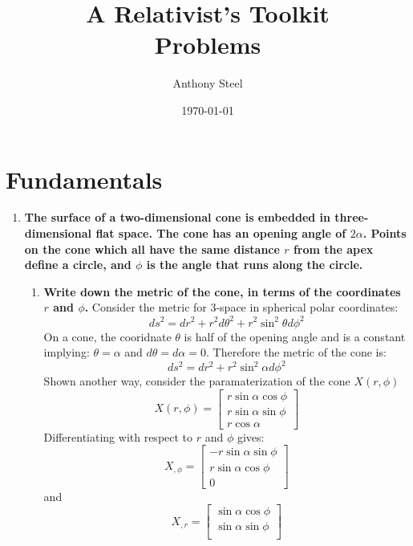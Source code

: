 \documentclass[9pt]{report}
\begin{document}
\title{A Relativist's Toolkit\protect\\ Problems}
\author{Anthony Steel}
\date{\today}
\maketitle
\chapter{Fundamentals}
\begin{enumerate}
  \item \textbf{The surface of a two-dimensional cone is embedded in
      three-dimensional flat space. The cone has an opening angle of
      $2\alpha$. Points on the cone which all have the same distance
      $r$ from the apex define a circle, and $\phi$ is the angle that
      runs along the circle.
    }
    \begin{enumerate}
      \item \textbf{Write down the metric of the cone, in terms of the
        coordinates $r$ and $\phi$.}
        Consider the metric for 3-space in spherical polar coordinates:
        \[
          ds^2 = dr^2 + r^2d\theta^2 + r^2\sin^2\theta d\phi^2
        \]
        On a cone, the cooridnate $\theta$ is half of the opening angle and is a
        constant implying: $\theta=\alpha$ and $d\theta=d\alpha=0$. Therefore
        the metric of the cone is:
        \[
          ds^2 = dr^2 + r^2\sin^2\alpha d\phi^2
        \]
        Shown another way, consider the paramaterization of the cone $X(r, \phi)$
        \[
          X(r, \phi) =
          \begin{bmatrix}
            r \sin\alpha \cos \phi\\
            r \sin\alpha \sin \phi \\
            r \cos \alpha
          \end{bmatrix}
        \]
        Differentiating with respect to $r$ and $\phi$ gives:
        \[
          X_{,\phi} =
          \begin{bmatrix}
            - r \sin\alpha \sin\phi \\
              r \sin\alpha \cos\phi \\
              0
          \end{bmatrix}
        \]
        and
        \[
          X_{,r} =
          \begin{bmatrix}
            \sin\alpha \cos \phi \\
            \sin \alpha \sin \phi \\

\end{bmatrix}\]
\end{enumerate}
\end{enumerate}
\end{document}
